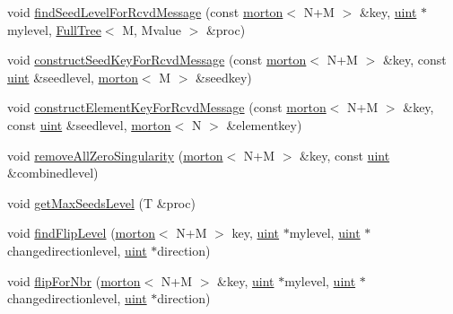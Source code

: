 \begin{DoxyCompactItemize}
\item 
void \mbox{\hyperlink{classTemplateForest_aad29cb335e971d8441e13f04d6c16af8}{find\+Seed\+Level\+For\+Rcvd\+Message}} (const \mbox{\hyperlink{definitions_8h_af8682350bd8bb38ee9023f7a0a310add}{morton}}$<$ N+M $>$ \&key, \mbox{\hyperlink{definitions_8h_a69aa29b598b851b0640aa225a9e5d61d}{uint}} $\ast$mylevel, \mbox{\hyperlink{classFullTree}{Full\+Tree}}$<$ M, Mvalue $>$ \&proc)
\item 
void \mbox{\hyperlink{classTemplateForest_a6418c12f88e909d8fb69736e320f92b7}{construct\+Seed\+Key\+For\+Rcvd\+Message}} (const \mbox{\hyperlink{definitions_8h_af8682350bd8bb38ee9023f7a0a310add}{morton}}$<$ N+M $>$ \&key, const \mbox{\hyperlink{definitions_8h_a69aa29b598b851b0640aa225a9e5d61d}{uint}} \&seedlevel, \mbox{\hyperlink{definitions_8h_af8682350bd8bb38ee9023f7a0a310add}{morton}}$<$ M $>$ \&seedkey)
\item 
void \mbox{\hyperlink{classTemplateForest_ab6f0a6f80253a0253ed7882dfdf052ad}{construct\+Element\+Key\+For\+Rcvd\+Message}} (const \mbox{\hyperlink{definitions_8h_af8682350bd8bb38ee9023f7a0a310add}{morton}}$<$ N+M $>$ \&key, const \mbox{\hyperlink{definitions_8h_a69aa29b598b851b0640aa225a9e5d61d}{uint}} \&seedlevel, \mbox{\hyperlink{definitions_8h_af8682350bd8bb38ee9023f7a0a310add}{morton}}$<$ N $>$ \&elementkey)
\item 
void \mbox{\hyperlink{classTemplateForest_a5c2bf9dfe92ff1cb400fdbdba4bedf78}{remove\+All\+Zero\+Singularity}} (\mbox{\hyperlink{definitions_8h_af8682350bd8bb38ee9023f7a0a310add}{morton}}$<$ N+M $>$ \&key, const \mbox{\hyperlink{definitions_8h_a69aa29b598b851b0640aa225a9e5d61d}{uint}} \&combinedlevel)
\item 
void \mbox{\hyperlink{classTemplateForest_a71631fc657f72080f48dee632e706f2d}{get\+Max\+Seeds\+Level}} (T \&proc)
\item 
void \mbox{\hyperlink{classTemplateForest_a555d9f60caf33b715ab58fa808170ebe}{find\+Flip\+Level}} (\mbox{\hyperlink{definitions_8h_af8682350bd8bb38ee9023f7a0a310add}{morton}}$<$ N+M $>$ key, \mbox{\hyperlink{definitions_8h_a69aa29b598b851b0640aa225a9e5d61d}{uint}} $\ast$mylevel, \mbox{\hyperlink{definitions_8h_a69aa29b598b851b0640aa225a9e5d61d}{uint}} $\ast$changedirectionlevel, \mbox{\hyperlink{definitions_8h_a69aa29b598b851b0640aa225a9e5d61d}{uint}} $\ast$direction)
\item 
void \mbox{\hyperlink{classTemplateForest_a59f1842488667c16b27c29618790d7c3}{flip\+For\+Nbr}} (\mbox{\hyperlink{definitions_8h_af8682350bd8bb38ee9023f7a0a310add}{morton}}$<$ N+M $>$ \&key, \mbox{\hyperlink{definitions_8h_a69aa29b598b851b0640aa225a9e5d61d}{uint}} $\ast$mylevel, \mbox{\hyperlink{definitions_8h_a69aa29b598b851b0640aa225a9e5d61d}{uint}} $\ast$changedirectionlevel, \mbox{\hyperlink{definitions_8h_a69aa29b598b851b0640aa225a9e5d61d}{uint}} $\ast$direction)

\end{DoxyCompactItemize}
